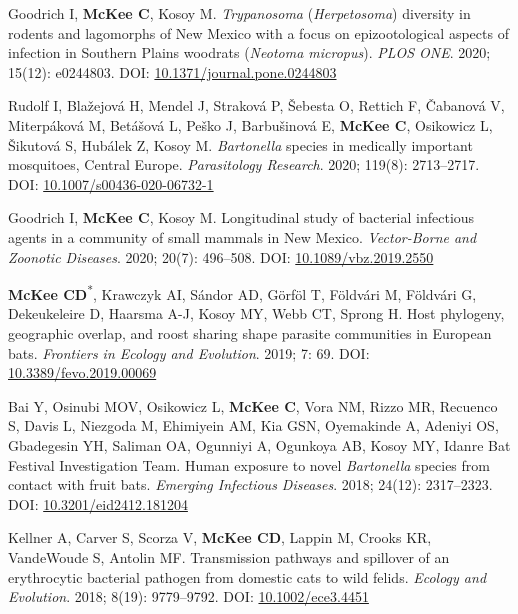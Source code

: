 \documentclass{cv}
\begin{document}
\begin{pubenum}
\item Goodrich I, \textbf{McKee C}, Kosoy M. \textit{Trypanosoma} (\textit{Herpetosoma}) diversity in rodents and lagomorphs of New Mexico with a focus on epizootological aspects of infection in Southern Plains woodrats (\textit{Neotoma micropus}). \textit{PLOS ONE}. 2020; 15(12): e0244803. DOI: \href{https://doi.org/10.1371/journal.pone.0244803}{10.1371/journal.pone.0244803}

\item Rudolf I, Blažejová H, Mendel J, Straková P, Šebesta O, Rettich F, Čabanová V, Miterpáková M, Betášová L, Peško J, Barbušinová E, \textbf{McKee C}, Osikowicz L, Šikutová S, Hubálek Z, Kosoy M. \textit{Bartonella} species in medically important mosquitoes, Central Europe. \textit{Parasitology Research}. 2020; 119(8): 2713--2717. DOI: \href{https://doi.org/10.1007/s00436-020-06732-1}{10.1007/s00436-020-06732-1}

\item Goodrich I, \textbf{McKee C}, Kosoy M. Longitudinal study of bacterial infectious agents in a community of small mammals in New Mexico. \textit{Vector-Borne and Zoonotic Diseases}. 2020; 20(7): 496--508. DOI: \href{https://doi.org/10.1089/vbz.2019.2550}{10.1089/vbz.2019.2550}

\item \textbf{McKee CD}\textsuperscript{*}, Krawczyk AI, Sándor AD, Görföl T, Földvári M, Földvári G, Dekeukeleire D, Haarsma A-J, Kosoy MY, Webb CT, Sprong H. Host phylogeny, geographic overlap, and roost sharing shape parasite communities in European bats. \textit{Frontiers in Ecology and Evolution}. 2019; 7: 69. DOI: \href{https://doi.org/10.3389/fevo.2019.00069}{10.3389/fevo.2019.00069}

\item Bai Y, Osinubi MOV, Osikowicz L, \textbf{McKee C}, Vora NM, Rizzo MR, Recuenco S, Davis L, Niezgoda M, Ehimiyein AM, Kia GSN, Oyemakinde A, Adeniyi OS, Gbadegesin YH, Saliman OA, Ogunniyi A, Ogunkoya AB, Kosoy MY, Idanre Bat Festival Investigation Team. Human exposure to novel \textit{Bartonella} species from contact with fruit bats. \textit{Emerging Infectious Diseases}. 2018; 24(12): 2317--2323. DOI: \href{https://doi.org/10.3201/eid2412.181204}{10.3201/eid2412.181204}

\item Kellner A, Carver S, Scorza V, \textbf{McKee CD}, Lappin M, Crooks KR, VandeWoude S, Antolin MF. Transmission pathways and spillover of an erythrocytic bacterial pathogen from domestic cats to wild felids. \textit{Ecology and Evolution}. 2018; 8(19): 9779--9792. DOI: \href{https://doi.org/10.1002/ece3.4451}{10.1002/ece3.4451}


\end{pubenum}
\end{document}
